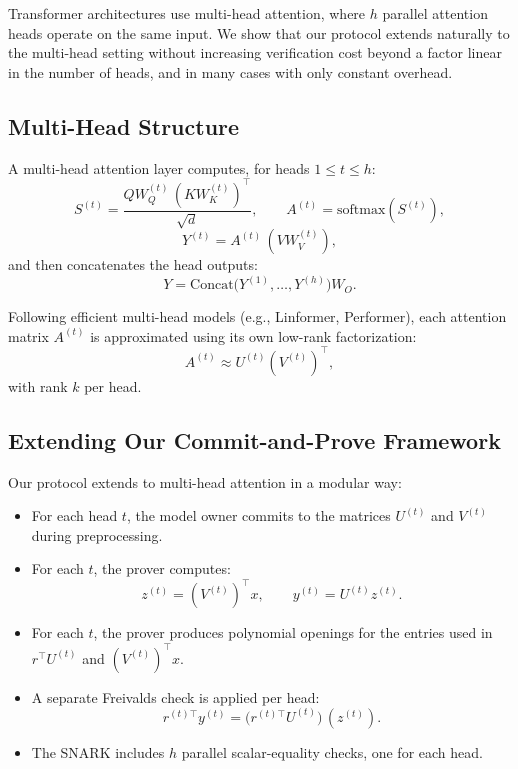 \documentclass[11pt]{article}
\begin{document}
Transformer architectures use multi-head attention, where $h$ parallel
attention heads operate on the same input.  
We show that our protocol extends naturally to the multi-head setting
without increasing verification cost beyond a factor linear in the
number of heads, and in many cases with only constant overhead.

\subsection{Multi-Head Structure}

A multi-head attention layer computes, for heads $1 \le t \le h$:
\[
  S^{(t)} = \frac{Q W_Q^{(t)} \, (K W_K^{(t)})^\top}{\sqrt{d}},
  \qquad
  A^{(t)} = \mathrm{softmax}(S^{(t)}),
\]
\[
  Y^{(t)} = A^{(t)} \, (V W_V^{(t)}),
\]
and then concatenates the head outputs:
\[
  Y = \mathrm{Concat}\big( Y^{(1)},\dots,Y^{(h)} \big) W_O.
\]

Following efficient multi-head models (e.g., Linformer, Performer), each
attention matrix $A^{(t)}$ is approximated using its own low-rank
factorization:
\[
  A^{(t)} \approx U^{(t)} (V^{(t)})^\top,
\]
with rank $k$ per head.

\subsection{Extending Our Commit-and-Prove Framework}

Our protocol extends to multi-head attention in a modular way:

\begin{itemize}
  \item For each head $t$, the model owner commits to the matrices
        $U^{(t)}$ and $V^{(t)}$ during preprocessing.
  \item For each $t$, the prover computes:
        \[
          z^{(t)} = (V^{(t)})^\top x, \qquad
          y^{(t)} = U^{(t)} z^{(t)}.
        \]
  \item For each $t$, the prover produces polynomial openings for the
        entries used in $r^\top U^{(t)}$ and $(V^{(t)})^\top x$.
  \item A separate Freivalds check is applied per head:
        \[
          r^{(t)\top} y^{(t)} = 
          \big(r^{(t)\top} U^{(t)}\big) \, (z^{(t)}).
        \]
  \item The SNARK includes $h$ parallel scalar-equality checks, one for
        each head.
\end{itemize}
\end{document}
